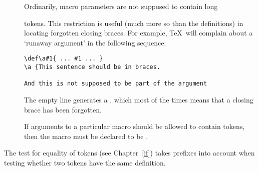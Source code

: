 \documentclass[letterpaper]{book}
\begin{document}
\begin{description}
\item []
Ordinarily, macro parameters are not supposed to contain
\cstoidx long\par
{} tokens. This restriction is useful (much more so
than the  definitions) in locating
forgotten closing braces. 
For example, \TeX\ will complain about a `runaway argument'
in the following sequence:
\begin{verbatim}
\def\a#1{ ... #1 ... }
\a {This sentence should be in braces.

And this is not supposed to be part of the argument
\end{verbatim}
The empty line generates a , which most of the times
means that a closing brace has been forgotten.

If arguments to a particular macro should be allowed
to contain  tokens,  then the macro must be declared
to be . \end{description}

The  test for equality of tokens 
(see Chapter~\ref{if}) takes prefixes into
account when testing whether two tokens have the same definition.

\begin{comment}
With a little ingenuity it is possible 
for \cs{par} tokens to sneak into macro arguments anyway.
Consider the example
\begin{verbatim}
\def\a#1\par!{ ... }
\a bc\par ef\par!
\end{verbatim}
Here the macro \cs{a} is not \cs{long}, but the argument
is \verb>bc\par ef>, which contains a \cs{par} token.
However,
this is of no importance in general.
\end{comment}
\end{document}
